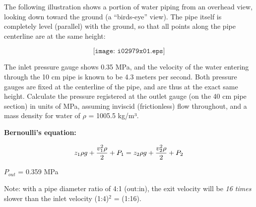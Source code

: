 

The following illustration shows a portion of water piping from an overhead view, looking down toward the ground (a ``birds-eye'' view).  The pipe itself is completely level (parallel) with the ground, so that all points along the pipe centerline are at the same height:

$$\texttt{[image: i02979x01.eps]}$$

The inlet pressure gauge shows 0.35 MPa, and the velocity of the water entering through the 10 cm pipe is known to be 4.3 meters per second.  Both pressure gauges are fixed at the centerline of the pipe, and are thus at the exact same height.  Calculate the pressure registered at the outlet gauge (on the 40 cm pipe section) in units of MPa, assuming inviscid (frictionless) flow throughout, and a mass density for water of $\rho$ = 1005.5 kg/m³.

\vskip 10pt

\noindent
{\bf Bernoulli's equation:}

$$z_1 \rho g + {v_1^2 \rho \over 2} + P_1 = z_2 \rho g + {v_2^2 \rho \over 2} + P_2$$







$P_{out}$ = 0.359 MPa

\vskip 10pt

Note: with a pipe diameter ratio of 4:1 (out:in), the exit velocity will be {\it 16 times} slower than the inlet velocity (1:4)$^{2}$ = (1:16).











